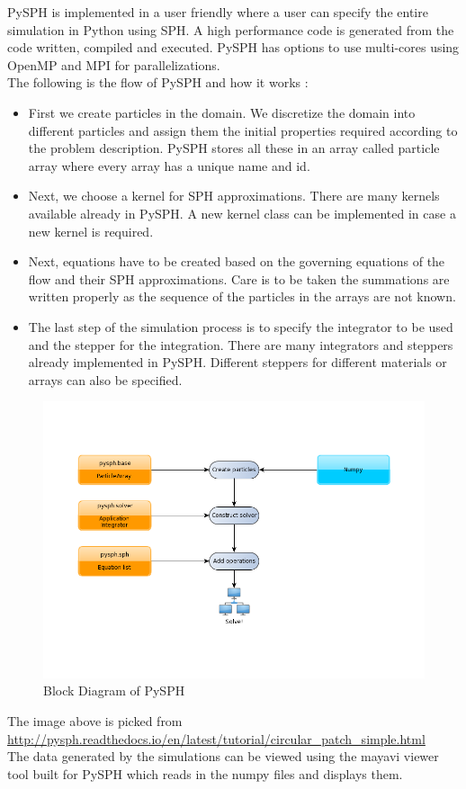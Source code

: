 PySPH is implemented in a user friendly where a user can specify the entire simulation in Python using SPH. A high performance code is generated from the code written, compiled and executed. PySPH has options to use multi-cores using OpenMP and MPI for parallelizations.\\



The following is the flow of PySPH and how it works \cite{janmejaya}:

\begin{itemize}
 \item First we create particles in the domain. We discretize the domain into different particles and assign them the initial properties required according to the problem description. PySPH stores all these in an array called particle array where every array has a unique name and id.
 \item Next, we choose a kernel for SPH approximations. There are many kernels available already in PySPH. A new kernel class can be implemented in case a new kernel is required.
 \item Next, equations have to be created based on the governing equations of the flow and their SPH approximations. Care is to be taken the summations are written properly as the sequence of the particles in the arrays are not known.
 \item The last step of the simulation process is to specify the integrator to be used and the stepper for the integration. There are many integrators and steppers already implemented in PySPH. Different steppers for different materials or arrays can also be specified.
\end{itemize}

\begin{figure}[H]
\includegraphics[width = \textwidth]{../pysph-examples-common-steps.png}
\caption{Block Diagram of PySPH}
\end{figure}

The image above is picked from \url{http://pysph.readthedocs.io/en/latest/tutorial/circular_patch_simple.html}\\

The data generated by the simulations can be viewed using the mayavi viewer tool built for PySPH which reads in the numpy files and displays them.

